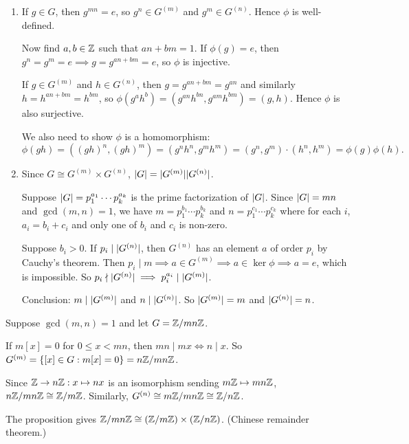 \documentclass[12pt,letterpaper]{report}
\begin{document}
\begin{thmproof}
  \begin{enumerate}
    \item
    If $g \in G$, then $g^{mn} = e$, so $g^n \in G^{(m)}$ and $g^m \in G^{(n)}$.
    Hence $\phi$ is well-defined.

    Now find $a, b \in \mathbb{Z}$ such that $an + bm = 1$.
    If $\phi(g) = e$, then $g^n = g^m = e \implies g = g^{an + bm} = e$, so $\phi$ is injective.

    If $g \in G^{(m)}$ and $h \in G^{(n)}$, then $g = g^{an + bm} = g^{an}$ and similarly
    $h = h^{an + bm} = h^{bm}$, so $\phi(g^a h^b) = (g^{an}h^{bn}, g^{am}h^{bm}) = (g, h)$.
    Hence $\phi$ is also surjective.

    We also need to show $\phi$ is a homomorphism:
    \[
      \phi(gh) = ((gh)^n, (gh)^m) = (g^nh^n, g^mh^m) = (g^n, g^m) \cdot (h^n, h^m) = \phi(g)\phi(h).
    \]
    \item
    Since $G \cong G^{(m)} \times G^{(n)}$, $\lvert G\rvert = \lvert G^{(m)}\rvert\lvert G^{(n)}\rvert$.

    Suppose $\lvert G\rvert = p_1^{a_1} \cdots p_k^{a_k}$ is the prime factorization of $\lvert G\rvert$.
    Since $\lvert G\rvert = mn$ and $\gcd(m, n) = 1$, we have $m = p_1^{b_1} \cdots p_k^{b_k}$ and
    $n = p_1^{c_1} \cdots p_k^{c_k}$ where for each $i$, $a_i = b_i + c_i$ and only one of
    $b_i$ and $c_i$ is non-zero.

    Suppose $b_i > 0$.
    If $p_i \mid \lvert G^{(n)}\rvert$, then $G^{(n)}$ has an element $a$ of order $p_i$ by Cauchy's
    theorem.
    Then $p_i \mid m \implies a \in G^{(m)} \implies a \in \ker\phi \implies a = e$, which is
    impossible.
    So $p_i \nmid \lvert G^{(n)}\rvert \implies p_i^{a_i} \mid \lvert G^{(m)}\rvert$.

    Conclusion: $m \mid \lvert G^{(m)}\rvert$ and $n \mid \lvert G^{(n)}\rvert$.
    So $\lvert G^{(m)}\rvert = m$ and $\lvert G^{(n)}\rvert = n$.
  \end{enumerate}
\end{thmproof}

\begin{ex}
  Suppose $\gcd(m, n) = 1$ and let $G = \mathbb{Z}/{mn}\mathbb{Z}$.

  If $m[x] = 0$ for $0 \leq x < mn$, then $mn \mid mx \iff n \mid x$.
  So $G^{(m)} = \{[x] \in G : m[x] = 0\} = n\mathbb{Z}/mn\mathbb{Z}$.

  Since $\mathbb{Z} \to n\mathbb{Z} : x \mapsto nx$ is an isomorphism sending
  $m\mathbb{Z} \mapsto mn\mathbb{Z}$, $n\mathbb{Z}/mn\mathbb{Z} \cong \mathbb{Z}/{m}\mathbb{Z}$.
  Similarly, $G^{(n)} \cong m\mathbb{Z}/mn\mathbb{Z} \cong \mathbb{Z}/{n}\mathbb{Z}$.

  The proposition gives $\mathbb{Z}/{mn}\mathbb{Z} \cong (\mathbb{Z}/{m}\mathbb{Z}) \times (\mathbb{Z}/{n}\mathbb{Z})$.
  (Chinese remainder theorem.)
\end{ex}
\end{document}
